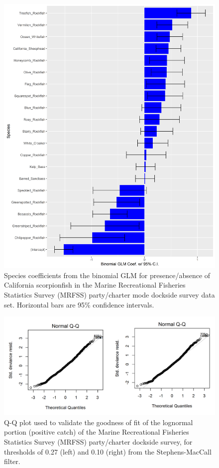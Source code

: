 \documentclass[12pt,]{article}
\begin{document}
\FloatBarrier

\begin{figure}[htbp]
\centering
\includegraphics{Figures/Fleet5_RecPC_dockside_SM.png}
\caption{Species coefficients from the binomial GLM for presence/absence
of California scorpionfish in the Marine Recreational Fisheries
Statistics Survey (MRFSS) party/charter mode dockside survey data set.
Horizontal bars are 95\% confidence intervals.
\label{fig:Fleet5_RecPC_docksideSM}}
\end{figure}

\begin{figure}[htbp]
\centering
\includegraphics{Figures/Fleet5_RecPC_dockside_QQ.png}
\caption{Q-Q plot used to validate the goodness of fit of the lognormal
portion (positive catch) of the Marine Recreational Fisheries Statistics
Survey (MRFSS) party/charter dockside survey, for thresholds of 0.27
(left) and 0.10 (right) from the Stephens-MacCall filter.
\label{fig:Fleet5_RecPC_docksideQQ}}
\end{figure}
\end{document}
